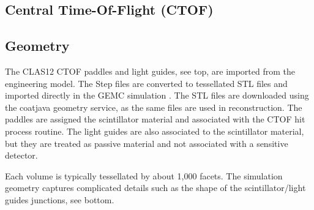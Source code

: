 \subsection{Central Time-Of-Flight (CTOF)}

\subsection{Geometry}

The CLAS12 CTOF paddles and light guides, see  top, are imported from the engineering model. The Step files are converted to tessellated STL files and imported
directly in the GEMC simulation \cite{gemcCad}. The STL files are downloaded using the coatjava geometry service, as the same files are used in reconstruction.
The paddles are assigned the scintillator material and associated with the CTOF hit process routine.
The light guides are also associated to the scintillator material, but they are treated as passive material and not associated with a sensitive detector.

Each volume is typically tessellated by about 1,000 facets. The simulation geometry captures complicated details such as the shape of the scintillator/light guides
junctions, see  bottom.


